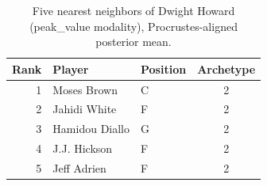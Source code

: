 \begin{table}[htbp]
  \centering\small
  \begin{tabular}{rllc}
    \toprule
    Rank & Player & Position & Archetype \\
    \midrule
    1 & Moses Brown & C & 2 \\
    2 & Jahidi White & F & 2 \\
    3 & Hamidou Diallo & G & 2 \\
    4 & J.J. Hickson & F & 2 \\
    5 & Jeff Adrien & F & 2 \\
    \bottomrule
  \end{tabular}
  \caption{Five nearest neighbors of Dwight Howard (peak_value modality), Procrustes-aligned posterior mean.}
  \label{tab:Dwight_Howard_neighbors_peak_value}
\end{table}

